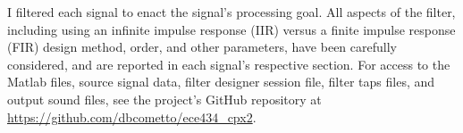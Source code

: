 I filtered each signal to enact the signal's processing goal.  All aspects of the filter, including using an infinite impulse response (IIR) versus a finite impulse response (FIR) design method, order, and other parameters, have been carefully considered, and are reported in each signal's respective section.  For access to the Matlab  files, source signal data, filter designer session  file, filter taps  files, and output  sound files, see the project's GitHub repository at \url{https://github.com/dbcometto/ece434_cpx2}.

